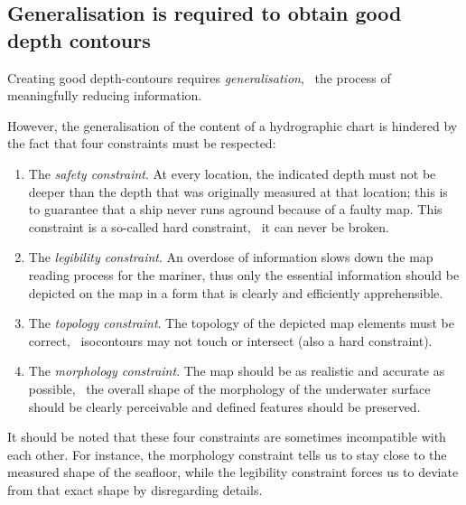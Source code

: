 %
\subsection{Generalisation is required to obtain good depth contours}
\label{sec:good-depth-contours}

Creating good depth-contours requires \emph{generalisation}, \ie\ the process of meaningfully reducing information.

%

However, the generalisation of the content of a hydrographic chart is hindered by the fact that four constraints must be respected:
\begin{enumerate}
  \item The \emph{safety constraint}.  
  At every location, the indicated depth must not be deeper than the depth that was originally measured at that location; this is to guarantee that a ship never runs aground because of a faulty map.
  This constraint is a so-called hard constraint, \ie\ it can never be broken.
  \item The \emph{legibility constraint}. 
  An overdose of information slows down the map reading process for the mariner, thus only the essential information should be depicted on the map in a form that is clearly and efficiently apprehensible. %
  \item The \emph{topology constraint}. 
  The topology of the depicted map elements must be correct, \ie\ isocontours may not touch or intersect (also a hard constraint).
  \item The \emph{morphology constraint}. 
  The map should be as realistic and accurate as possible, \ie\ the overall shape of the morphology of the underwater surface should be clearly perceivable and defined features should be preserved.
\end{enumerate}

It should be noted that these four constraints are sometimes incompatible with each other. 
For instance, the morphology constraint tells us to stay close to the measured shape of the seafloor, while the legibility constraint forces us to deviate from that exact shape by disregarding details. 

%

